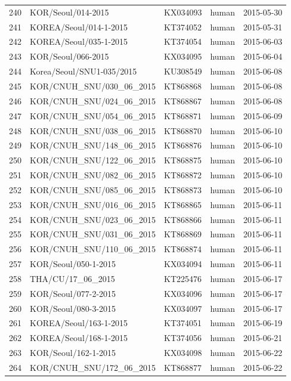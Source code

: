 \documentclass[11pt,oneside,letterpaper]{article}
\begin{document}
\begin{longtable}{ | r | l | p{2cm} | l | l | }
  240 & KOR/Seoul/014-2015 & KX034093 & human & 2015-05-30 \\
  241 & KOREA/Seoul/014-1-2015 & KT374052 & human & 2015-05-31 \\
  242 & KOREA/Seoul/035-1-2015 & KT374054 & human & 2015-06-03 \\
  243 & KOR/Seoul/066-2015 & KX034095 & human & 2015-06-04 \\
  244 & Korea/Seoul/SNU1-035/2015 & KU308549 & human & 2015-06-08 \\
  245 & KOR/CNUH\_SNU/030\_06\_2015 & KT868868 & human & 2015-06-08 \\
  246 & KOR/CNUH\_SNU/024\_06\_2015 & KT868867 & human & 2015-06-08 \\
  247 & KOR/CNUH\_SNU/054\_06\_2015 & KT868871 & human & 2015-06-09 \\
  248 & KOR/CNUH\_SNU/038\_06\_2015 & KT868870 & human & 2015-06-10 \\
  249 & KOR/CNUH\_SNU/148\_06\_2015 & KT868876 & human & 2015-06-10 \\
  250 & KOR/CNUH\_SNU/122\_06\_2015 & KT868875 & human & 2015-06-10 \\
  251 & KOR/CNUH\_SNU/082\_06\_2015 & KT868872 & human & 2015-06-10 \\
  252 & KOR/CNUH\_SNU/085\_06\_2015 & KT868873 & human & 2015-06-10 \\
  253 & KOR/CNUH\_SNU/016\_06\_2015 & KT868865 & human & 2015-06-11 \\
  254 & KOR/CNUH\_SNU/023\_06\_2015 & KT868866 & human & 2015-06-11 \\
  255 & KOR/CNUH\_SNU/031\_06\_2015 & KT868869 & human & 2015-06-11 \\
  256 & KOR/CNUH\_SNU/110\_06\_2015 & KT868874 & human & 2015-06-11 \\
  257 & KOR/Seoul/050-1-2015 & KX034094 & human & 2015-06-11 \\
  258 & THA/CU/17\_06\_2015 & KT225476 & human & 2015-06-17 \\
  259 & KOR/Seoul/077-2-2015 & KX034096 & human & 2015-06-17 \\
  260 & KOR/Seoul/080-3-2015 & KX034097 & human & 2015-06-17 \\
  261 & KOREA/Seoul/163-1-2015 & KT374051 & human & 2015-06-19 \\
  262 & KOREA/Seoul/168-1-2015 & KT374056 & human & 2015-06-21 \\
  263 & KOR/Seoul/162-1-2015 & KX034098 & human & 2015-06-22 \\
  264 & KOR/CNUH\_SNU/172\_06\_2015 & KT868877 & human & 2015-06-22 \\

\end{longtable}
\end{document}
